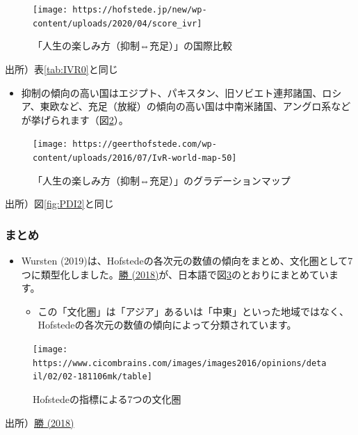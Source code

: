 \documentclass[
]{book}
\providecommand{\tightlist}{%
  \setlength{\itemsep}{0pt}\setlength{\parskip}{0pt}}
\begin{document}
\begin{figure}
\texttt{[image: https://hofstede.jp/new/wp-content/uploads/2020/04/score\_ivr]} \caption{「人生の楽しみ方（抑制⇔充足）」の国際比較}\label{fig:IVR1}
\end{figure}

出所）表\ref{tab:IVR0}と同じ

\begin{itemize}
\tightlist
\item
  抑制の傾向の高い国はエジプト、パキスタン、旧ソビエト連邦諸国、ロシア、東欧など、充足（放縦）の傾向の高い国は中南米諸国、アングロ系などが挙げられます（図\ref{fig:IVR2}）。
\end{itemize}

\begin{figure}
\texttt{[image: https://geerthofstede.com/wp-content/uploads/2016/07/IvR-world-map-50]} \caption{「人生の楽しみ方（抑制⇔充足）」のグラデーションマップ}\label{fig:IVR2}
\end{figure}

出所）図\ref{fig:PDI2}と同じ

\hypertarget{ux307eux3068ux3081}{%
\subsubsection{まとめ}\label{ux307eux3068ux3081}}

\begin{itemize}
\item
  Wursten (2019)は、Hofstedeの各次元の数値の傾向をまとめ、文化圏として7つに類型化しました。\href{https://www.cicombrains.com/opinions/02/02-181106mk.html}{勝 (2018)}が、日本語で図\ref{fig:hof-summery}のとおりにまとめています。

  \begin{itemize}
  \tightlist
  \item
    この「文化圏」は「アジア」あるいは「中東」といった地域ではなく、Hofstedeの各次元の数値の傾向によって分類されています。
  \end{itemize}
\end{itemize}

\begin{figure}
\texttt{[image: https://www.cicombrains.com/images/images2016/opinions/detail/02/02-181106mk/table]} \caption{Hofstedeの指標による7つの文化圏}\label{fig:hof-summery}
\end{figure}

出所）\href{https://www.cicombrains.com/opinions/02/02-181106mk.html}{勝 (2018)}
\end{document}
